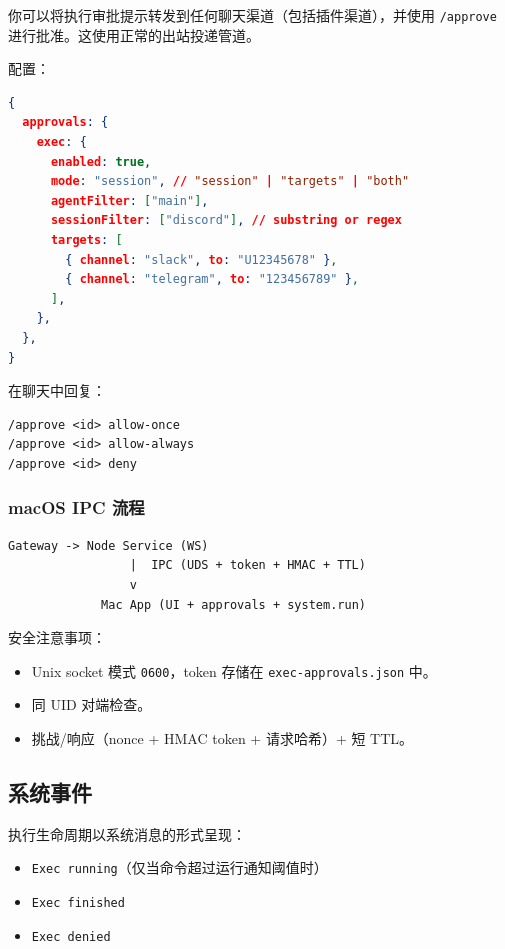 你可以将执行审批提示转发到任何聊天渠道（包括插件渠道），并使用 \texttt{/approve} 进行批准。这使用正常的出站投递管道。

配置：

\begin{lstlisting}[language=json]
{
  approvals: {
    exec: {
      enabled: true,
      mode: "session", // "session" | "targets" | "both"
      agentFilter: ["main"],
      sessionFilter: ["discord"], // substring or regex
      targets: [
        { channel: "slack", to: "U12345678" },
        { channel: "telegram", to: "123456789" },
      ],
    },
  },
}
\end{lstlisting}


在聊天中回复：

\begin{lstlisting}
/approve <id> allow-once
/approve <id> allow-always
/approve <id> deny
\end{lstlisting}


\subsubsection{macOS IPC 流程}


\begin{lstlisting}
Gateway -> Node Service (WS)
                 |  IPC (UDS + token + HMAC + TTL)
                 v
             Mac App (UI + approvals + system.run)
\end{lstlisting}


安全注意事项：

\begin{itemize}
  \item Unix socket 模式 \texttt{0600}，token 存储在 \texttt{exec-approvals.json} 中。
  \item 同 UID 对端检查。
  \item 挑战/响应（nonce + HMAC token + 请求哈希）+ 短 TTL。
\end{itemize}


\subsection{系统事件}


执行生命周期以系统消息的形式呈现：

\begin{itemize}
  \item \texttt{Exec running}（仅当命令超过运行通知阈值时）
  \item \texttt{Exec finished}
  \item \texttt{Exec denied}
\end{itemize}


